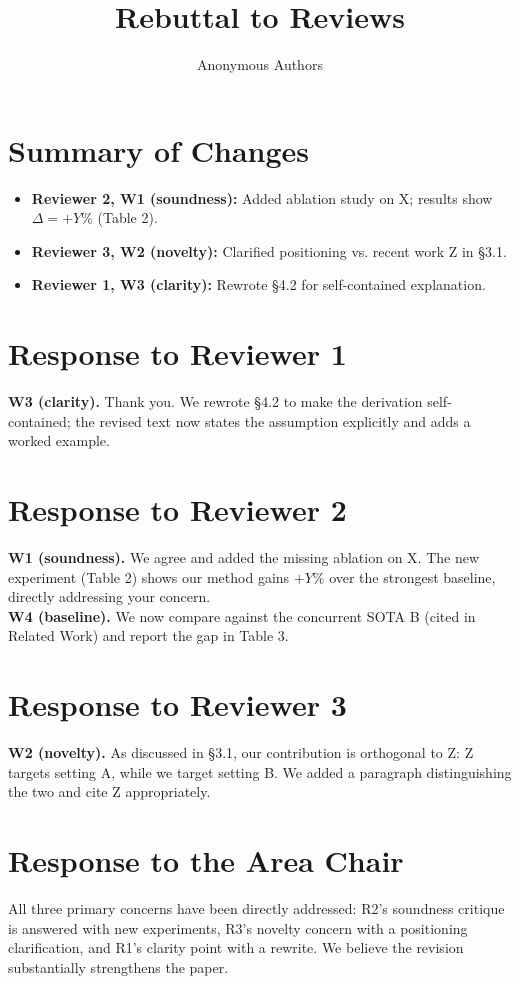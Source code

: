 \documentclass[11pt]{article}
\title{Rebuttal to Reviews}
\author{Anonymous Authors}
\date{}
\begin{document}
\maketitle

\section*{Summary of Changes}
\begin{itemize}
  \item \textbf{Reviewer 2, W1 (soundness):} Added ablation study on X; results show $\Delta=+Y\%$ (Table 2).
  \item \textbf{Reviewer 3, W2 (novelty):} Clarified positioning vs. recent work Z in \S3.1.
  \item \textbf{Reviewer 1, W3 (clarity):} Rewrote \S4.2 for self-contained explanation.
\end{itemize}

\section*{Response to Reviewer 1}
\textbf{W3 (clarity).} Thank you. We rewrote \S4.2 to make the derivation self-contained; the revised text now states the assumption explicitly and adds a worked example.

\section*{Response to Reviewer 2}
\textbf{W1 (soundness).} We agree and added the missing ablation on X. The new experiment (Table 2) shows our method gains $+Y\%$ over the strongest baseline, directly addressing your concern. \\
\textbf{W4 (baseline).} We now compare against the concurrent SOTA B (cited in Related Work) and report the gap in Table 3.

\section*{Response to Reviewer 3}
\textbf{W2 (novelty).} As discussed in \S3.1, our contribution is orthogonal to Z: Z targets setting A, while we target setting B. We added a paragraph distinguishing the two and cite Z appropriately.

\section*{Response to the Area Chair}
All three primary concerns have been directly addressed: R2's soundness critique is answered with new experiments, R3's novelty concern with a positioning clarification, and R1's clarity point with a rewrite. We believe the revision substantially strengthens the paper.
\end{document}
